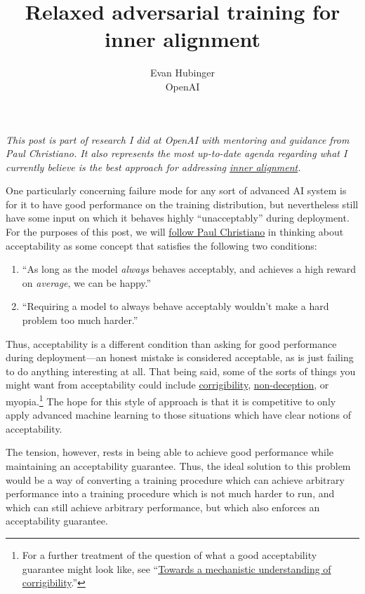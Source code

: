 \documentclass{amsart}
\title{Relaxed adversarial training for inner alignment}
\author{Evan Hubinger \\ OpenAI}
\begin{document}
\maketitle

\textit{This post is part of research I did at OpenAI with mentoring and guidance from Paul Christiano. It also represents the most up-to-date agenda regarding what I currently believe is the best approach for addressing \href{https://arxiv.org/abs/1906.01820}{inner alignment}.}

One particularly concerning failure mode for any sort of advanced AI system is for it to have good performance on the training distribution, but nevertheless still have some input on which it behaves highly ``unacceptably'' during deployment. For the purposes of this post, we will \href{https://ai-alignment.com/training-robust-corrigibility-ce0e0a3b9b4d}{follow Paul Christiano} in thinking about acceptability as some concept that satisfies the following two conditions:
\begin{enumerate}
    \item ``As long as the model \textit{always} behaves acceptably, and achieves a high reward on \textit{average}, we can be happy.''
    \item ``Requiring a model to always behave acceptably wouldn't make a hard problem too much harder.''
\end{enumerate}
Thus, acceptability is a different condition than asking for good performance during deployment---an honest mistake is considered acceptable, as is just failing to do anything interesting at all. That being said, some of the sorts of things you might want from acceptability could include \href{https://ai-alignment.com/corrigibility-3039e668638}{corrigibility}, \href{https://www.alignmentforum.org/s/r9tYkB2a8Fp4DN8yB/p/zthDPAjh9w6Ytbeks}{non-deception}, or myopia.\footnote{For a further treatment of the question of what a good acceptability guarantee might look like, see ``\href{https://www.alignmentforum.org/posts/BKM8uQS6QdJPZLqCr/towards-a-mechanistic-understanding-of-corrigibility}{Towards a mechanistic understanding of corrigibility}.''} The hope for this style of approach is that it is competitive to only apply advanced machine learning to those situations which have clear notions of acceptability.

The tension, however, rests in being able to achieve good performance while maintaining an acceptability guarantee. Thus, the ideal solution to this problem would be a way of converting a training procedure which can achieve arbitrary performance into a training procedure which is not much harder to run, and which can still achieve arbitrary performance, but which also enforces an acceptability guarantee.
\end{document}
